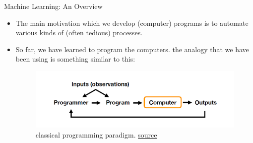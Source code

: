 \documentclass[compress,oilve]{beamer}
\begin{document}


\begin{frame}{Machine Learning: An Overview}
\begin{itemize}
\item The main motivation which we develop (computer) programs is to automate various
kinds of (often tedious) processes.
\item So far, we have learned to program the computers. the analogy that we have been using is something similar to this:\\

\begin{center}
\begin{figure}
\includegraphics[scale=0.5]{1}
\caption{classical programming paradigm. \href{https://sebastianraschka.com/faq/docs/datascience-ml.html}{source}}
\end{figure}
\end{center}
\end{itemize}
\end{frame}
\end{document}
